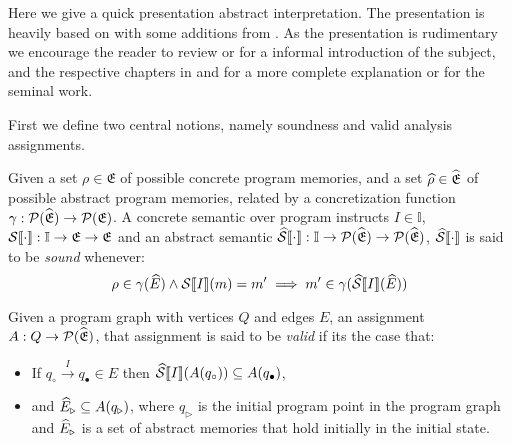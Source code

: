 Here we give a quick presentation abstract interpretation.
The presentation is heavily based on \cite{nielson_formal_2019} with some additions from \cite{moller_statitc_nodate}.
As the presentation is rudimentary we encourage the reader to review \cite{noauthor_abstract_nodate} or \cite{cousot_abstract_1996} for a informal introduction of the subject, and the respective chapters in \cite{nielson_formal_2019} and \cite{moller_statitc_nodate} for a more complete explanation or \cite{cousot_abstract_1977} for the seminal work.

First we define two central notions, namely soundness and valid analysis assignments.

\begin{definition}
    Given a set $\rho \in \mathfrak{E}$ of possible concrete program memories, and a set $\widehat{\rho} \in \widehat{\mathfrak{E}}$ of possible abstract program memories, related by a concretization function $\gamma : \mathcal{P}(\widehat{\mathfrak{E}}) \rightarrow \mathcal{P}(\mathfrak{E})$.
    A concrete semantic over program instructs $I \in \mathbb{I}$, $\mathcal{S} \llbracket \cdot \rrbracket : \mathbb{I} \rightarrow \mathfrak{E} \rightarrow \mathfrak{E}$ and an abstract semantic $\widehat{\mathcal{S}} \llbracket \cdot \rrbracket : \mathbb{I} \rightarrow \mathcal{P}(\widehat{\mathfrak{E}}) \rightarrow \mathcal{P}(\widehat{\mathfrak{E}})$, $\widehat{\mathcal{S}} \llbracket \cdot \rrbracket$ is said to be \emph{sound} whenever:
    \begin{equation}
        \rho \in \gamma(\widehat{E}) \land \mathcal{S} \llbracket I \rrbracket(m) = m' \implies m' \in \gamma(\widehat{\mathcal{S}} \llbracket I \rrbracket(\widehat{E}))
    \end{equation}
\end{definition}

\begin{definition}\label{def:valid}
    Given a program graph with vertices $Q$ and edges $E$, an assignment $A : Q \rightarrow \mathcal{P}(\widehat{\mathfrak{E}})$, that assignment is said to be \emph{valid} if its the case that:
    \begin{itemize}
        \item If $q_\circ \xrightarrow{I} q_\bullet \in E$ then $\widehat{\mathcal{S}} \llbracket I \rrbracket(A(q_\circ)) \subseteq A(q_\bullet)$,
        \item and $\widehat{E}_\triangleright \subseteq A(q_\triangleright)$, where $q_\triangleright$ is the initial program point in the program graph and $\widehat{E}_\triangleright$ is a set of abstract memories that hold initially in the initial state.
    \end{itemize}
\end{definition}

